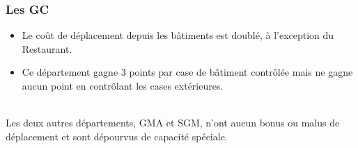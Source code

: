 \subsubsection{Les GC}
\begin{itemize}
\item Le coût de déplacement depuis les bâtiments est doublé, à l'exception du Restaurant. 
\item Ce département gagne 3 points par case de bâtiment contrôlée mais ne gagne aucun point en contrôlant les cases extérieures. 
\end{itemize}
\\
Les deux autres départements, GMA et SGM, n'ont aucun bonus ou malus de déplacement et sont dépourvus de capacité spéciale.
